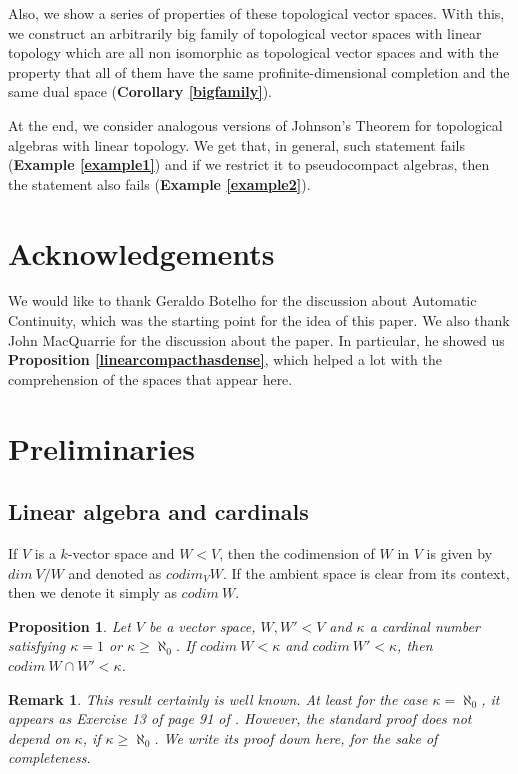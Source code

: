 \documentclass[a4paper,12pt]{article}
\newtheorem{prop}{Proposition}[section]
\newtheorem{obs}{Remark}[section]
\theoremstyle{bloco}
\begin{document}
Also, we show a series of properties of these topological vector spaces. With this, we construct an arbitrarily big family of topological vector spaces with linear topology which are all non isomorphic as topological vector spaces and with the property that all of them have the same profinite-dimensional completion and the same dual space (\textbf{Corollary \ref{bigfamily}}).

At the end, we consider analogous versions of Johnson's Theorem for topological algebras with linear topology. We get that, in general, such statement fails (\textbf{Example \ref{example1}}) and if we restrict it to pseudocompact algebras, then the statement also fails (\textbf{Example \ref{example2}}). 

\section*{Acknowledgements}

We would like to thank Geraldo Botelho for the discussion about Automatic Continuity, which was the starting point for the idea of this paper. We also thank John MacQuarrie for the discussion about the paper. In particular, he showed us \textbf{Proposition \ref{linearcompacthasdense}}, which helped a lot with the comprehension of the spaces that appear here.

\section{Preliminaries}


\subsection{Linear algebra and cardinals}



If $V$ is a $k$-vector space and $W < V$, then the codimension of $W$ in $V$ is given by $dim \ V/W$ and denoted as $codim_{V}W$. If the ambient space is clear from its context, then we denote it simply as $codim \ W$.

\begin{prop}\label{codimensionofintersection}Let $V$ be a vector space, $W,W' < V$ and $\kappa$ a cardinal number satisfying $\kappa = 1$ or $\kappa \geqslant \aleph_{0}$. If $codim \ W < \kappa$ and $codim \ W' < \kappa$, then $codim \ W \cap W' < \kappa$.
\end{prop}

\begin{obs}This result certainly is well known. At least for the case $\kappa = \aleph_{0}$, it  appears as Exercise 13 of page 91 of \cite{Rom}. However, the standard proof does not depend on $\kappa$, if $\kappa \geqslant \aleph_{0}$. We write its proof down here, for the sake of completeness.
\end{obs}
\end{document}
